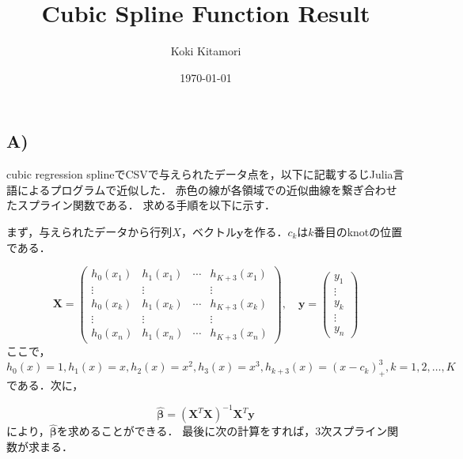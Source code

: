 \documentclass[dvipdfmx]{ujarticle}
\begin{document}
\author{Koki Kitamori}
\title{Cubic Spline Function Result}
\date{\today}
\maketitle

\section{}
\subsection*{A)}

cubic regression splineでCSVで与えられたデータ点を，以下に記載するじJulia言語によるプログラムで近似した．
赤色の線が各領域での近似曲線を繋ぎ合わせたスプライン関数である．
求める手順を以下に示す．

まず，与えられたデータから行列$X$，ベクトル$\boldsymbol{y}$を作る．$c_k$は$k$番目のknotの位置である．

\begin{equation}
\mathbf{X}=\left(\begin{array}{cccc}
h_{0}\left(x_{1}\right) & h_{1}\left(x_{1}\right) & \cdots & h_{K+3}\left(x_{1}\right) \\
\vdots & \vdots & & \vdots \\
h_{0}\left(x_{k}\right) & h_{1}\left(x_{k}\right) & \cdots & h_{K+3}\left(x_{k}\right) \\
\vdots & \vdots & & \vdots \\
h_{0}\left(x_{n}\right) & h_{1}\left(x_{n}\right) & \cdots & h_{K+3}\left(x_{n}\right)
\end{array}\right), \quad \boldsymbol{y}=\left(\begin{array}{c}
y_{1} \\
\vdots \\
y_{k} \\
\vdots \\
y_{n}
\end{array}\right)
\end{equation}
ここで，$h_{0}(x)=1, h_{1}(x)=x, h_{2}(x)=x^{2}, h_{3}(x)=x^{3}, h_{k+3}(x)=\left(x-c_{k}\right)_{+}^{3}, k=1,2, \ldots, K$である．次に，

\begin{equation}
\hat{\boldsymbol{\beta}}=\left(\mathbf{X}^{T} \mathbf{X}\right)^{-1} \mathbf{X}^{T} \boldsymbol{y}
\end{equation}
により，$\hat{\boldsymbol{\beta}}$を求めることができる．
最後に次の計算をすれば，3次スプライン関数が求まる．
\end{document}
